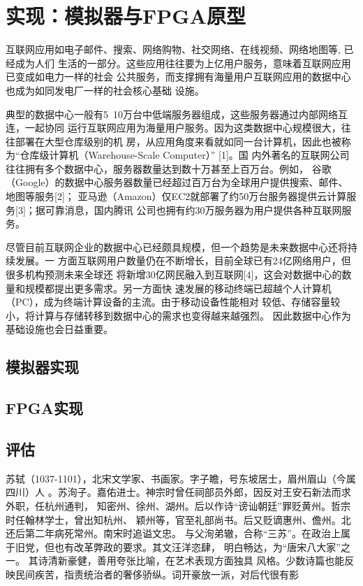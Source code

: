 

\chapter{实现：模拟器与FPGA原型}
\label{cha:pardimpl}

互联网应用如电子邮件、搜索、网络购物、社交网络、在线视频、网络地图等, 已经成为人们
生活的一部分。这些应用往往要为上亿用户服务，意味着互联网应用已变成如电力一样的社会
公共服务，而支撑拥有海量用户互联网应用的数据中心也成为如同发电厂一样的社会核心基础
设施。

典型的数据中心一般有5~10万台中低端服务器组成，这些服务器通过内部网络互连，一起协同
运行互联网应用为海量用户服务。因为这类数据中心规模很大，往往部署在大型仓库级别的机
房，从应用角度来看就如同一台计算机，因此也被称为“仓库级计算机（Warehouse-Scale Computer）” [1]。国
内外著名的互联网公司往往拥有多个数据中心，服务器数量达到数十万甚至上百万台。例如，
谷歌（Google）的数据中心服务器数量已经超过百万台为全球用户提供搜索、邮件、地图等服务[2]；
亚马逊（Amazon）仅EC2就部署了约50万台服务器提供云计算服务[3]；据可靠消息，国内腾讯
公司也拥有约30万服务器为用户提供各种互联网服务。

尽管目前互联网企业的数据中心已经颇具规模，但一个趋势是未来数据中心还将持续发展。一
方面互联网用户数量仍在不断增长，目前全球已有24亿网络用户，但很多机构预测未来全球还
将新增30亿网民融入到互联网[4]，这会对数据中心的数量和规模都提出更多需求。另一方面快
速发展的移动终端已超越个人计算机（PC），成为终端计算设备的主流。由于移动设备性能相对
较低、存储容量较小，将计算与存储转移到数据中心的需求也变得越来越强烈。
因此数据中心作为基础设施也会日益重要。

\section{模拟器实现}

\section{FPGA实现}

\section{评估}

苏轼（1037-1101），北宋文学家、书画家。字子瞻，号东坡居士，眉州眉山（今属四川）人
。苏洵子。嘉佑进士。神宗时曾任祠部员外郎，因反对王安石新法而求外职，任杭州通判，
知密州、徐州、湖州。后以作诗“谤讪朝廷”罪贬黄州。哲宗时任翰林学士，曾出知杭州、
颖州等，官至礼部尚书。后又贬谪惠州、儋州。北还后第二年病死常州。南宋时追谥文忠。
与父洵弟辙，合称“三苏”。在政治上属于旧党，但也有改革弊政的要求。其文汪洋恣肆，
明白畅达，为“唐宋八大家”之一。  其诗清新豪健，善用夸张比喻，在艺术表现方面独具
风格。少数诗篇也能反映民间疾苦，指责统治者的奢侈骄纵。词开豪放一派，对后代很有影

